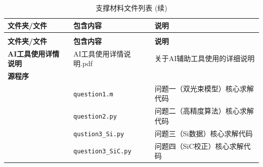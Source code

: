 \documentclass[withoutpreface,bwprint]{cumcmthesis} %
\begin{document}
\begin{longtable}{
    >{\raggedright\arraybackslash}p{} %
    >{\raggedright\arraybackslash}p{}  %
    >{\raggedright\arraybackslash}p{}  %
}

\caption{支撑材料文件列表} \label{tab:supporting_files} \\
\toprule
\textbf{文件夹/文件} & \textbf{包含内容} & \textbf{说明} \\
\midrule
\endfirsthead

\caption[]{支撑材料文件列表 (续)} \\
\toprule
\textbf{文件夹/文件} & \textbf{包含内容} & \textbf{说明} \\
\midrule
\endhead

\bottomrule
\endlastfoot

\textbf{AI工具使用详情说明} & AI工具使用详情说明.pdf & 关于AI辅助工具使用的详细说明 \\
\midrule

\textbf{源程序} & & \\
& \texttt{question1.m} & 问题一（双光束模型）核心求解代码 \\
& \texttt{question2.py} & 问题二（高精度算法）核心求解代码 \\
& \texttt{qustion3\_Si.py} & 问题三（Si数据）核心求解代码 \\
& \texttt{question3\_SiC.py} & 问题四（SiC校正）核心求解代码 \\
\midrule


\end{longtable}
\end{document}
